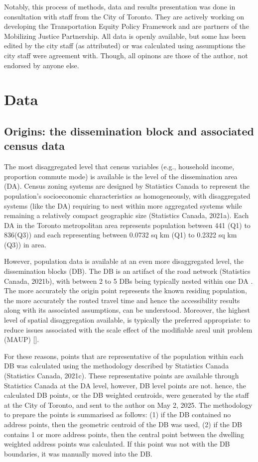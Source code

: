 \documentclass[
11pt, %
oneside, %
english, %
singlespacing, %
]{macthesis} %
\begin{document}
Notably, this process of methods, data and results presentation was done in consultation with staff from the City of Toronto. They are actively working on developing the Transportation Equity Policy Framework and are partners of the Mobilizing Justice Partnership. All data is openly available, but some has been edited by the city staff (as attributed) or was calculated using assumptions the city staff were agreement with. Though, all opinons are those of the author, not endorsed by anyone else.

\section{Data}\label{data}

\subsection{Origins: the dissemination block and associated census data}\label{origins-the-dissemination-block-and-associated-census-data}

The most disaggregated level that census variables (e.g., household income, proportion commute mode) is available is the level of the dissemination area (DA). Census zoning systems are designed by Statistics Canada to represent the population's socioeconomic characteristics as homogeneously, with disaggregated systems (like the DA) requiring to nest within more aggregated systems while remaining a relatively compact geographic size (Statistics Canada, 2021a). Each DA in the Toronto metropolitan area represents population between 441 (Q1) to 836(Q3)) and each representing between 0.0732 sq km (Q1) to 0.2322 sq km (Q3)) in area.

However, population data is available at an even more disaggregated level, the dissemination blocks (DB). The DB is an artifact of the road network (Statistics Canada, 2021b), with between 2 to 5 DBs being typically nested within one DA . The more accurately the origin point represents the known residing population, the more accurately the routed travel time and hence the accessibility results along with its associated assumptions, can be understood. Moreover, the highest level of spatial disaggregation available, is typically the preferred appropriate: to reduce issues associated with the scale effect of the modifiable areal unit problem (MAUP) {[}{]}.

For these reasons, points that are representative of the population within each DB was calculated using the methodology described by Statistics Canada (Statistics Canada, 2021c). These representative points are available through Statistics Canada at the DA level, however, DB level points are not. hence, the calculated DB points, or the DB weighted centroids, were generated by the staff at the City of Toronto, and sent to the author on May 2, 2025. The methodology to prepare the points is summarised as follows: (1) if the DB contained no address points, then the geometric centroid of the DB was used, (2) if the DB contains 1 or more address points, then the central point between the dwelling weighted address points was calculated. If this point was not with the DB boundaries, it was manually moved into the DB.
\end{document}
